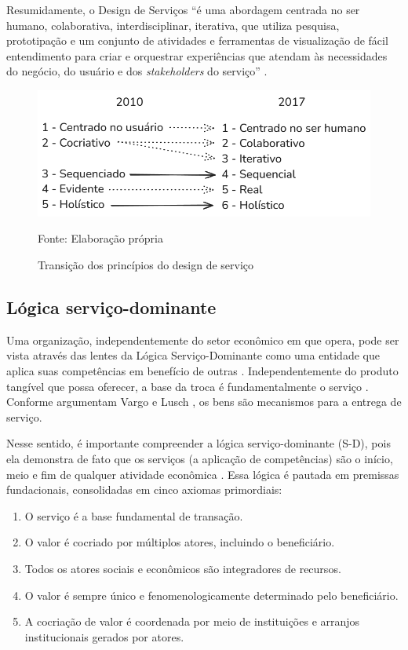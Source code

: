 Resumidamente, o Design de Serviços ``é uma abordagem centrada no ser humano, colaborativa, interdisciplinar, iterativa, que utiliza pesquisa, prototipação e um conjunto de atividades e ferramentas de visualização de fácil entendimento para criar e orquestrar experiências que atendam às necessidades do negócio, do usuário e dos \textit{stakeholders} do serviço'' \cite{Stickdorn2019}.

\begin{figure}[h]
	\centering %
	\includegraphics[width=16cm]{figuras/principios.png} %
	\caption{Transição dos princípios do design de serviço}
	Fonte: Elaboração própria
	\label{figura:qualquernome}
\end{figure}

\subsection{Lógica serviço-dominante}

Uma organização, independentemente do setor econômico em que opera, pode ser vista através das lentes da Lógica Serviço-Dominante como uma entidade que aplica suas competências em benefício de outras \cite{VargoLusch2004Evolving}. Independentemente do produto tangível que possa oferecer, a base da troca é fundamentalmente o serviço \cite{VargoLusch2004Evolving}. Conforme argumentam Vargo e Lusch \cite{VargoLusch2004Evolving}, os bens são mecanismos para a entrega de serviço.

Nesse sentido, é importante compreender a lógica serviço-dominante (S-D), pois ela demonstra de fato que os serviços (a aplicação de competências) são o início, meio e fim de qualquer atividade econômica \cite{VargoLusch2004Evolving}. Essa lógica é pautada em premissas fundacionais, consolidadas em cinco axiomas primordiais:

\begin{enumerate}
	\item O serviço é a base fundamental de transação.
	\item O valor é cocriado por múltiplos atores, incluindo o beneficiário.
	\item Todos os atores sociais e econômicos são integradores de recursos.
	\item O valor é sempre único e fenomenologicamente determinado pelo beneficiário.
	\item A cocriação de valor é coordenada por meio de instituições e arranjos institucionais gerados por atores.
\end{enumerate}

